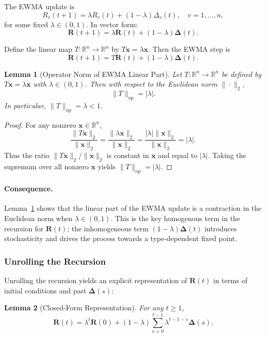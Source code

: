 \documentclass[11pt]{article}
\theoremstyle{plain}
\newtheorem{lemma}{Lemma}
\theoremstyle{definition}
\begin{document}
The EWMA update is
\[
R_v(t+1) = \lambda R_v(t) + (1-\lambda)\Delta_v(t), \quad v = 1,\dots,n,
\]
for some fixed \(\lambda \in (0,1)\). In vector form:
\[
\bm{R}(t+1) = \lambda \bm{R}(t) + (1-\lambda)\bm{\Delta}(t).
\]

Define the linear map \(T:\mathbb{R}^n \to \mathbb{R}^n\) by \(T\bm{x} = \lambda \bm{x}\). Then the EWMA step is
\[
\bm{R}(t+1) = T\bm{R}(t) + (1-\lambda)\bm{\Delta}(t).
\]

\begin{lemma}[Operator Norm of EWMA Linear Part]
\label{lem:ewma-operator}
Let \(T:\mathbb{R}^n \to \mathbb{R}^n\) be defined by \(T\bm{x} = \lambda \bm{x}\) with \(\lambda \in (0,1)\). Then with respect to the Euclidean norm \(\|\cdot\|_2\),
\[
\|T\|_{\mathrm{op}} = |\lambda|.
\]
In particular, \(\|T\|_{\mathrm{op}} = \lambda < 1\).
\end{lemma}

\begin{proof}
For any nonzero \(\bm{x} \in \mathbb{R}^n\),
\[
\frac{\|T\bm{x}\|_2}{\|\bm{x}\|_2}
= \frac{\|\lambda \bm{x}\|_2}{\|\bm{x}\|_2}
= \frac{|\lambda|\|\bm{x}\|_2}{\|\bm{x}\|_2}
= |\lambda|.
\]
Thus the ratio \(\|T\bm{x}\|_2 / \|\bm{x}\|_2\) is constant in \(\bm{x}\) and equal to \(|\lambda|\). Taking the supremum over all nonzero \(\bm{x}\) yields \(\|T\|_{\mathrm{op}} = |\lambda|\).
\end{proof}

\paragraph{Consequence.}
Lemma~\ref{lem:ewma-operator} shows that the linear part of the EWMA update is a contraction in the Euclidean norm when \(\lambda \in (0,1)\). This is the key homogenous term in the recursion for \(\bm{R}(t)\); the inhomogeneous term \((1-\lambda)\bm{\Delta}(t)\) introduces stochasticity and drives the process towards a type-dependent fixed point.

\subsubsection{Unrolling the Recursion}

Unrolling the recursion yields an explicit representation of \(\bm{R}(t)\) in terms of initial conditions and past \(\bm{\Delta}(s)\):

\begin{lemma}[Closed-Form Representation]
\label{lem:ewma-unroll}
For any \(t \ge 1\),
\[
\bm{R}(t)
= \lambda^t \bm{R}(0) + (1-\lambda)\sum_{s=0}^{t-1} \lambda^{t-1-s} \bm{\Delta}(s).
\]
\end{lemma}
\end{document}
